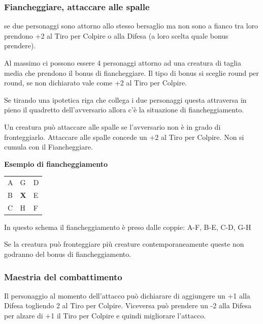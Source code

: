 \begin{multicols}{2}
\subsubsection{Fiancheggiare, attaccare alle spalle}\hypertarget{fiancheggiare}{} \label{fiancheggiare}

se due personaggi sono attorno allo stesso bersaglio ma non sono a fianco tra loro prendono +2 al Tiro per Colpire o alla Difesa (a loro scelta quale bonus prendere).

Al massimo ci possono essere 4 personaggi attorno ad una creatura di taglia media che prendono il bonus di fiancheggiare. Il tipo di bonus si sceglie round per round, se non dichiarato vale come +2 al Tiro per Colpire.

Se tirando una ipotetica riga che collega i due personaggi questa attraversa in pieno il quadretto dell'avversario allora c'è la situazione di fiancheggiamento.

Un creatura può attaccare alle spalle se l'avversario non è in grado di fronteggiarlo. Attaccare alle spalle concede un +2 al Tiro per Colpire. Non si cumula con il Fiancheggiare.

\medskip

\textbf{Esempio di fiancheggiamento}

\medskip
\begin{center}

\begin{tabular}{lll}
\hline
A & G & D\\
B & \textbf{X} & E\\
C & H & F
\end{tabular}
\end{center}

\bigskip

In questo schema il fiancheggiamento è preso dalle coppie: A-F, B-E, C-D, G-H

\bigskip

Se la creatura può fronteggiare più creature contemporaneamente queste non godranno del bonus di fiancheggiamento.

\subsubsection{Maestria del combattimento} \label{maestriacombattimento}

Il personaggio al momento dell'attacco può dichiarare di aggiungere un +1 alla Difesa togliendo 2 al Tiro per Colpire. Viceversa può prendere un -2 alla Difesa per alzare di +1 il Tiro per Colpire e quindi migliorare l'attacco.


\end{multicols}

